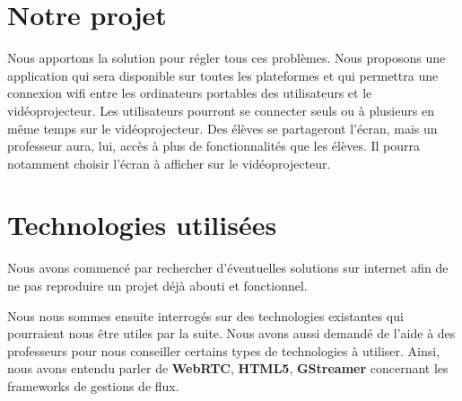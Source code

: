 \documentclass[a4paper, 11pt]{article}
\begin{document}
\section{Notre projet}

Nous apportons la solution pour régler tous ces problèmes. Nous proposons une application qui sera disponible sur toutes les plateformes et qui permettra une connexion wifi entre les ordinateurs portables des utilisateurs et le vidéoprojecteur. Les utilisateurs pourront se connecter seuls ou à plusieurs en même temps sur le vidéoprojecteur. Des élèves se partageront l'écran, mais un professeur aura, lui, accès à plus de fonctionnalités que les élèves. Il pourra notamment choisir l'écran à afficher sur le vidéoprojecteur.

\section{Technologies utilisées}

Nous avons commencé par rechercher d'éventuelles solutions sur internet afin de ne pas reproduire un projet déjà abouti et fonctionnel. 

Nous nous sommes ensuite interrogés sur des technologies existantes qui pourraient nous être utiles par la suite. Nous avons aussi demandé de l'aide à des professeurs pour nous conseiller certains types de technologies à utiliser. Ainsi, nous avons entendu parler de \textbf{WebRTC}, \textbf{HTML5}, \textbf{GStreamer} concernant les frameworks de gestions de flux. 
\end{document}
